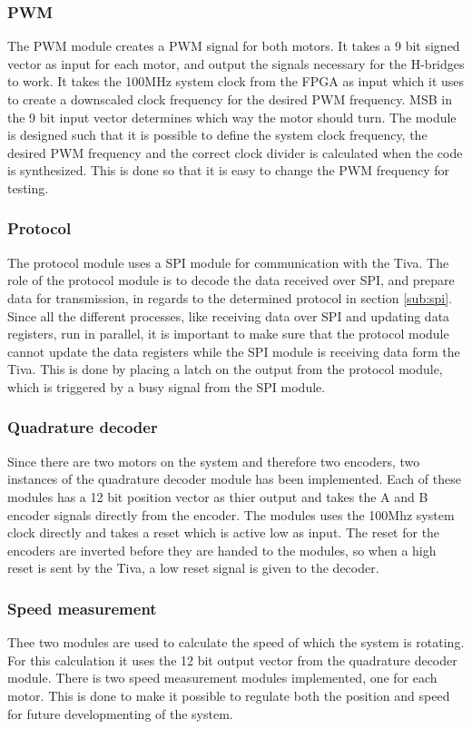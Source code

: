 \documentclass[../../../main]{subfiles}
\begin{document}
\subsubsection{PWM}
The PWM module creates a PWM signal for both motors. It takes a 9 bit signed vector as input for each motor, and output the signals necessary for the H-bridges to work.
It takes the 100MHz system clock from the FPGA as input which it uses to create a downscaled clock frequency for the desired PWM frequency.
MSB in the 9 bit input vector determines which way the motor should turn.
The module is designed such that it is possible to define the system clock frequency, the desired PWM frequency and the correct clock divider is calculated when the code is synthesized.
This is done so that it is easy to change the PWM frequency for testing.
\subsubsection{Protocol}
The protocol module uses a SPI module \cite{spi_git_module} for communication with the Tiva.
The role of the protocol module is to decode the data received over SPI, and prepare data for transmission, in regards to the determined protocol in section \ref{sub:spi}.
\\
Since all the different processes, like receiving data over SPI and updating data registers, run in parallel, it is important to make sure that the protocol module cannot update the data registers while the SPI module is receiving data form the Tiva.
This is done by placing a latch on the output from the protocol module, which is triggered by a busy signal from the SPI module.

\subsubsection{Quadrature decoder}
\label{subsubsec:Qdecoder_implement}
Since there are two motors on the system and therefore two encoders, two instances of the quadrature decoder module has been implemented.
Each of these modules has a 12 bit position vector as thier output and takes the A and B encoder signals directly from the encoder. The modules uses the 100Mhz system clock directly and takes a reset which is active low as input.
The reset for the encoders are inverted before they are handed to the modules, so when a high reset is sent by the Tiva, a low reset signal is given to the decoder.


\subsubsection{Speed measurement}
Thee two modules are used to calculate the speed of which the system is rotating. For this calculation it uses the 12 bit output vector from the quadrature decoder module.
There is two speed measurement modules implemented, one for each motor.
This is done to make it possible to regulate both the position and speed for future developmenting of the system.
\end{document}
